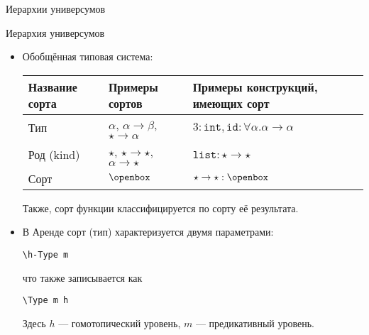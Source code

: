 \documentclass[aspectratio=169,dvipsnames,usenames]{beamer}
\begin{document}
\newtheorem{dfn}{Определение}[section]
\newtheorem{nte}{Замечание}[section]

\newtheorem{axiom}{Аксиома}[section]
\newtheorem{thm}{Теорема}[section]
\newtheorem{lmm}[theorem]{Лемма}
\newtheorem{statement}{Утверждение}[section]
\newtheorem{oun_paragraph}{Пункт}[section]
\newtheorem{cons}{Следствие}[section]
\newtheorem*{exm}{Пример}

\newcommand{\comb}[1]{\operatorname{\mathcal{#1}}}
\newcommand{\func}[1]{\operatorname{#1}}
\newcommand{\reduction}[1]{{\color{OrangeRed}#1}}
\newcommand{\set}[1]{\left\{#1\right\}}

\def\from#1{\par \parbox{0.7\textwidth}{\par \hfill\raggedleft \it #1}} 

\begin{frame}{}
\begin{center}
{\LARGE Иерархии универсумов}
\end{center}
\end{frame}

\begin{frame}[fragile]{Иерархия универсумов}
\begin{itemize}

\item Обобщённая типовая система:

\vspace{0.3cm}\begin{tabular}{lll}
Название сорта & Примеры сортов & Примеры конструкций, имеющих сорт\\\hline
Тип & $\alpha$, $\alpha\rightarrow\beta$, $\star\rightarrow\alpha$ & $3:\texttt{int}, \texttt{id}: \forall\alpha.\alpha\rightarrow\alpha$\\
Род (kind) & $\star$, $\star\rightarrow\star$, $\alpha\rightarrow\star$ & $\texttt{list}: \star\rightarrow\star$\\
Сорт & $\openbox$ & $\star\rightarrow\star : \openbox$
\end{tabular}

Также, сорт функции классифицируется по сорту её результата.

\item В Аренде сорт (тип) характеризуется двумя параметрами:

\begin{center}\verb!\h-Type m!\end{center}что также записывается как\begin{center}\verb!\Type m h!\end{center}

Здесь $h$ --- гомотопический уровень, $m$ --- предикативный уровень.
\end{itemize}

\end{frame}
\end{document}
